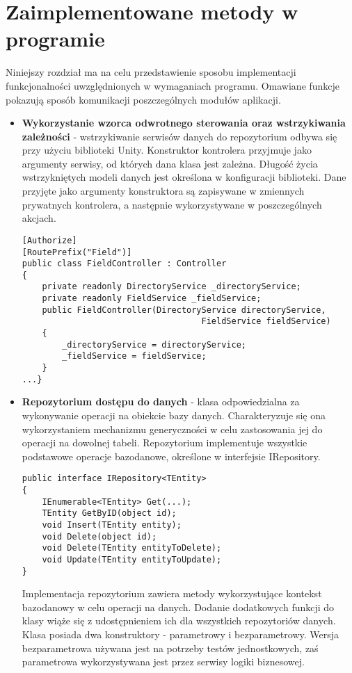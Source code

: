 \section{Zaimplementowane metody w programie}
Niniejszy rozdział ma na celu przedstawienie sposobu implementacji funkcjonalności uwzględnionych w wymaganiach programu. Omawiane funkcje pokazują sposób komunikacji poszczególnych modułów aplikacji.
\\
\begin{itemize}
\item \textbf{Wykorzystanie wzorca odwrotnego sterowania oraz wstrzykiwania zależności} - wstrzykiwanie serwisów danych do repozytorium odbywa się przy użyciu biblioteki Unity. Konstruktor kontrolera przyjmuje jako argumenty serwisy, od których dana klasa jest zależna. Długość życia wstrzykniętych modeli danych jest określona w konfiguracji biblioteki. Dane przyjęte jako argumenty konstruktora są zapisywane w zmiennych prywatnych kontrolera, a następnie wykorzystywane w poszczególnych akcjach.

\begin{lstlisting}[caption=Wstrzyknięcie serwisów danych do konstruktora kontrolera]
[Authorize]
[RoutePrefix("Field")]
public class FieldController : Controller
{
	private readonly DirectoryService _directoryService;
	private readonly FieldService _fieldService;
	public FieldController(DirectoryService directoryService, 
									FieldService fieldService)
	{
		_directoryService = directoryService;
		_fieldService = fieldService;
	}
...}
\end{lstlisting}  

\item \textbf{Repozytorium dostępu do danych} - klasa odpowiedzialna za wykonywanie operacji na obiekcie bazy danych. Charakteryzuje się ona wykorzystaniem mechanizmu generyczności w celu zastosowania jej do operacji na dowolnej tabeli. Repozytorium implementuje wszystkie podstawowe operacje bazodanowe, określone w interfejsie IRepository.
\begin{lstlisting}[caption=Interfejs repozytorium dostępu do danych]
public interface IRepository<TEntity>
{
	IEnumerable<TEntity> Get(...);	
	TEntity GetByID(object id);
	void Insert(TEntity entity);
	void Delete(object id);
	void Delete(TEntity entityToDelete);
	void Update(TEntity entityToUpdate);
}
\end{lstlisting}  

Implementacja repozytorium zawiera metody wykorzystujące kontekst bazodanowy w celu operacji na danych. Dodanie dodatkowych funkcji do klasy wiąże się z udostępnieniem ich dla wszystkich repozytoriów danych.
Klasa posiada dwa konstruktory - parametrowy i bezparametrowy. Wersja bezparametrowa używana jest na potrzeby testów jednostkowych, zaś parametrowa wykorzystywana jest przez serwisy logiki biznesowej.


\end{itemize}
